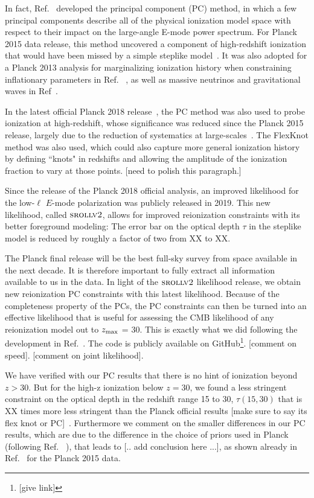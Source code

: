 \documentclass[prd,twocolumn,amsmath,amssymb,floatfix,superscriptaddress,nofootinbib]{revtex4-1}
\newcommand{\zmax}{z_{\rm max}}
\begin{document}
In fact, Ref.~\cite{Hu:2003gh, Mortonson:2007hq} developed the principal component (PC) method, in which a few principal components describe all of the physical ionization model space with respect to their impact on the large-angle E-mode power spectrum. For Planck 2015 data release, this method uncovered a component of high-redshift ionization that would have been missed by a simple steplike model~\cite{Heinrich:2016ojb}. It was also adopted for a Planck 2013 analysis for marginalizing ionization history when constraining inflationary parameters in Ref.
~\cite{Planck:2013jfk}, as well as massive neutrinos and gravitational waves in Ref~\cite{Dai:2015dwa}. 

In the latest official Planck 2018 release~\cite{Aghanim:2018eyx}, the PC method was also used to probe ionization at high-redshift, whose significance was reduced since the Planck 2015 release, largely due to the reduction of systematics at large-scales~\cite{Aghanim:2018eyx, Heinrich:2018btc}. The FlexKnot method was also used, which could also capture more general ionization history by defining 
``knots" in redshifts and allowing the amplitude of the ionization fraction to vary at those points. [need to polish this paragraph.]

Since the release of the Planck 2018 official analysis, an improved likelihood for the low-$\ell$ $E$-mode polarization was publicly released in 2019. This new likelihood, called $\textsc{srollv2}$, allows for improved reionization constraints with its better foreground modeling: The error bar on the optical depth $\tau$ in the steplike model is reduced by roughly a factor of two from XX to XX. 

The Planck final release will be the best full-sky survey from space available in the next decade. It is therefore important to fully extract all information available to us in the data. In light of the $\textsc{srollv2}$ likelihood release, we obtain new reionization PC constraints with this latest likelihood. Because of the completeness property of the PCs, the PC constraints can then be turned into an effective likelihood that is useful for assessing the CMB likelihood of any reionization model out to $\zmax$ = 30. This is exactly what we did following the development in Ref.~\cite{Heinrich:2016ojb}. The code is publicly available on GitHub\footnote{[give link]}. [comment on speed]. [comment on joint likelihood].

We have verified with our PC results that there is no hint of ionization beyond $z>30$. But for the high-z ionization below $z=30$, we found a less stringent constraint on the optical depth in the redshift range 15 to 30, $\tau(15, 30)$ that is XX times more less stringent than the Planck official results [make sure to say its flex knot or PC]~\cite{Aghanim:2018eyx}. Furthermore we comment on the smaller differences in our PC results, which are due to the difference in the choice of priors used in Planck (following Ref.
~\cite{Millea:2018bko}), that leads to [.. add conclusion here ...], as shown already in Ref.~\cite{Heinrich:2018btc} for the Planck 2015 data. 
\end{document}
